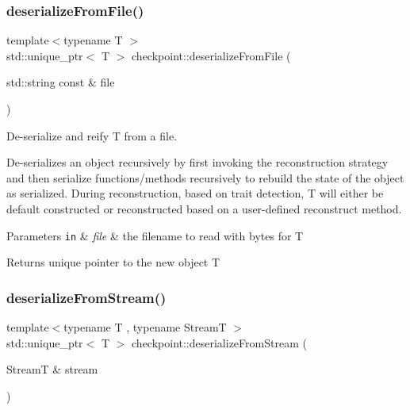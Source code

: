 \mbox{\label{namespacecheckpoint_ad71bcfe197379c59aa16f737b7e2cf3e}} 
\subsubsection{\texorpdfstring{deserialize\+From\+File()}{deserializeFromFile()}}
{\footnotesize\ttfamily template$<$typename T $>$ \\
std\+::unique\+\_\+ptr$<$ T $>$ checkpoint\+::deserialize\+From\+File (\begin{DoxyParamCaption}\item[{std\+::string const \&}]{file }\end{DoxyParamCaption})}



De-\/serialize and reify {\ttfamily T} from a file. 

De-\/serializes an object recursively by first invoking the reconstruction strategy and then {\ttfamily serialize} functions/methods recursively to rebuild the state of the object as serialized. During reconstruction, based on trait detection, {\ttfamily T} will either be default constructed or reconstructed based on a user-\/defined reconstruct method.


\begin{DoxyParams}[1]{Parameters}
\mbox{\tt in}  & {\em file} & the filename to read with bytes for {\ttfamily T} \\
\hline
\end{DoxyParams}
\begin{DoxyReturn}{Returns}
unique pointer to the new object {\ttfamily T} 
\end{DoxyReturn}
\mbox{\label{namespacecheckpoint_aa9a7965554c62b089bb326961747368d}} 
\subsubsection{\texorpdfstring{deserialize\+From\+Stream()}{deserializeFromStream()}}
{\footnotesize\ttfamily template$<$typename T , typename StreamT $>$ \\
std\+::unique\+\_\+ptr$<$ T $>$ checkpoint\+::deserialize\+From\+Stream (\begin{DoxyParamCaption}\item[{StreamT \&}]{stream }\end{DoxyParamCaption})}



